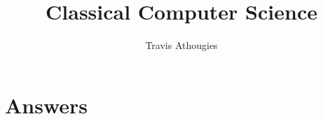 \documentclass[12pt,twoside,symmetric,nobib]{tufte-book}
\title{Classical Computer Science}
\author{Travis Athougies}
\date{}
\newcounter{week}
\begin{document}
\maketitle
\tableofcontents

\mainmatter






%

\appendix

\chapter{Answers}

\printanswers
\end{document}

